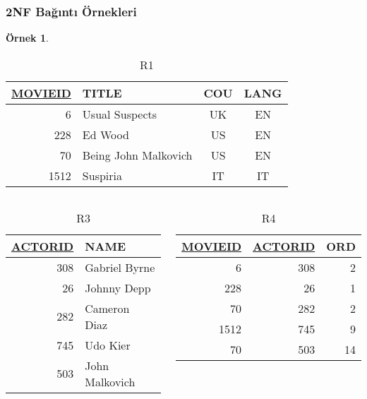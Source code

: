 \documentclass[dvipsnames]{beamer}
\theoremstyle{definition}
\theoremstyle{example}
\newtheorem{ornek}[theorem]{Örnek}
\theoremstyle{plain}
\begin{document}
\begin{frame}
  \frametitle{2NF Bağıntı Örnekleri}

  \begin{ornek}
    \begin{center}
      \begin{tiny}
      \begin{table}
        \caption{R1}
        \begin{tabular}{|r|l|c|c|}\hline
\underline{MOVIEID} & TITLE    & COU & LANG\\[2pt]\hline\hline
      6 & Usual Suspects       & UK  &  EN \\\hline
    228 & Ed Wood              & US  &  EN \\\hline
     70 & Being John Malkovich & US  &  EN \\\hline
   1512 & Suspiria             & IT  &  IT \\\hline
        \end{tabular}
      \end{table}
      \end{tiny}
    \end{center}

    \vspace{-0.7cm}
    \begin{columns}[t]
      \begin{tiny}
      \begin{table}
        \caption{R3}
        \begin{tabular}{|r|l|}\hline
\underline{ACTORID} & NAME\\[2pt]\hline\hline
      308 & Gabriel Byrne \\\hline
       26 & Johnny Depp   \\\hline
      282 & Cameron Diaz  \\\hline
      745 & Udo Kier      \\\hline
      503 & John Malkovich\\\hline
        \end{tabular}
      \end{table}
      \end{tiny}

      \begin{tiny}
      \begin{table}
        \caption{R4}
        \begin{tabular}{|r|r|r|}\hline
\underline{MOVIEID} & \underline{ACTORID} & ORD\\[2pt]\hline\hline
   6 & 308 &  2\\\hline
 228 &  26 &  1\\\hline
  70 & 282 &  2\\\hline
1512 & 745 &  9\\\hline
  70 & 503 & 14\\\hline
        \end{tabular}
      \end{table}
      \end{tiny}
    \end{columns}
  \end{ornek}
\end{frame}
\end{document}
